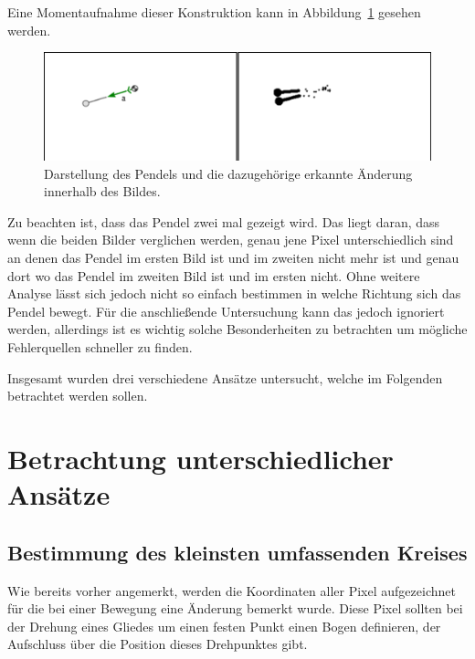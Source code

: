 Eine Momentaufnahme dieser Konstruktion kann in Abbildung~\ref{fig:compareImages} gesehen werden.

\begin{figure}[htb]
    \includegraphics[width=\textwidth]{gfx/compare_images_1.png}
    \caption{Darstellung des Pendels und die dazugehörige erkannte Änderung innerhalb des Bildes.}
    \label{fig:compareImages}
\end{figure}

Zu beachten ist, dass das Pendel zwei mal gezeigt wird.
Das liegt daran, dass wenn die beiden Bilder verglichen werden, genau jene Pixel unterschiedlich sind an denen das Pendel im ersten Bild ist und im zweiten nicht mehr ist und genau dort wo das Pendel im zweiten Bild ist und im ersten nicht.
Ohne weitere Analyse lässt sich jedoch nicht so einfach bestimmen in welche Richtung sich das Pendel bewegt.
Für die anschließende Untersuchung kann das jedoch ignoriert werden, allerdings ist es wichtig solche Besonderheiten zu betrachten um mögliche Fehlerquellen schneller zu finden.


Insgesamt wurden drei verschiedene Ansätze untersucht, welche im Folgenden betrachtet werden sollen.

\section{Betrachtung unterschiedlicher Ansätze}

\subsection{Bestimmung des kleinsten umfassenden Kreises}

Wie bereits vorher angemerkt, werden die Koordinaten aller Pixel aufgezeichnet für die bei einer Bewegung eine Änderung bemerkt wurde.
Diese Pixel sollten bei der Drehung eines Gliedes um einen festen Punkt einen Bogen definieren, der Aufschluss über die Position dieses Drehpunktes gibt.

